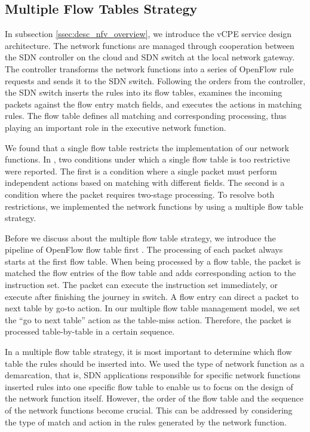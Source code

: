 \documentclass[conference]{IEEEtran}
\begin{document}
\subsection{Multiple Flow Tables Strategy}
In subsection \ref{ssec:desc_nfv_overview}, we introduce the vCPE service design architecture. The network functions are managed through cooperation between the SDN controller on the cloud and SDN switch at the local network gateway. The controller transforms the network functions into a series of OpenFlow rule requests and sends it to the SDN switch. Following the orders from the controller, the SDN switch inserts the rules into its flow tables, examines the incoming packets against the flow entry match fields, and executes the actions in matching rules. The flow table \cite{sdn-ft} defines all matching and corresponding processing, thus playing an important role in the executive network function.

We found that a single flow table restricts the implementation of our network functions. In \cite{multiple-flow-table}, two conditions under which a single flow table is too restrictive were reported. The first is a condition where a single packet must perform independent actions based on matching with different fields. The second is a condition where the packet requires two-stage processing. To resolve both restrictions, we implemented the network functions by using a multiple flow table strategy.

Before we discuss about the multiple flow table strategy, we introduce the pipeline of OpenFlow flow table first \cite{openflow-spec}. The processing of each packet always starts at the first flow table. When being processed by a flow table, the packet is matched the flow entries of the flow table and adds corresponding action to the instruction set. The packet can execute the instruction set immediately, or execute after finishing the journey in switch. A flow entry can direct a packet to next table by go-to action. In our multiple flow table management model, we set the ``go to next table'' action as the table-miss action. Therefore, the packet is processed table-by-table in a certain sequence.

In a multiple flow table strategy, it is most important to determine which flow table the rules should be inserted into. We used the type of network function as a demarcation, that is, SDN applications responsible for specific network functions inserted rules into one specific flow table to enable us to focus on the design of the network function itself. However, the order of the flow table and the sequence of the network functions become crucial. This can be addressed by considering the type of match and action in the rules generated by the network function.
\end{document}
